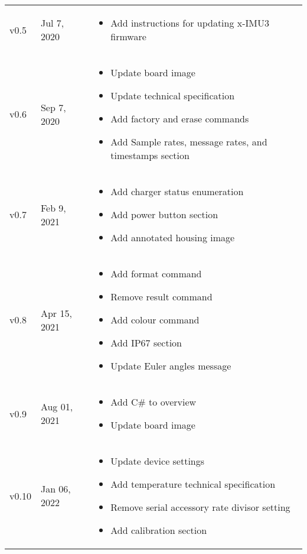 \begin{longtable}{| >{\centering}p{} | p{} | >{\raggedright\arraybackslash}p{} |}
    v0.5 & Jul 7, 2020 &
    \begin{itemize}
        \item Add instructions for updating x-IMU3 firmware
    \end{itemize}\\
    v0.6 & Sep 7, 2020 &
    \begin{itemize}
        \item Update board image
        \item Update technical specification
        \item Add factory and erase commands
        \item Add Sample rates, message rates, and timestamps section
    \end{itemize}\\
    v0.7 & Feb 9, 2021 &
    \begin{itemize}
        \item Add charger status enumeration
        \item Add power button section
        \item Add annotated housing image
    \end{itemize}\\
    v0.8 & Apr 15, 2021 &
    \begin{itemize}
        \item Add format command
        \item Remove result command
        \item Add colour command
        \item Add \ac{IP67} section
        \item Update Euler angles message
    \end{itemize}\\
    v0.9 & Aug 01, 2021 &
    \begin{itemize}
        \item Add C\# to overview
        \item Update board image
    \end{itemize}\\
    v0.10 & Jan 06, 2022 &
    \begin{itemize}
        \item Update device settings
        \item Add temperature technical specification
        \item Remove serial accessory rate divisor setting
        \item Add calibration section
    \end{itemize}\\

\end{longtable}
